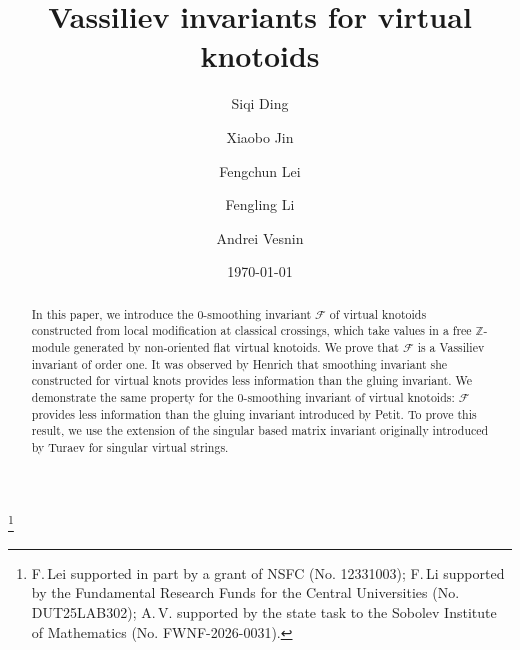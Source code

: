 \documentclass[11pt]{amsart}
\theoremstyle{noparens}
\numberwithin{equation}{section}
\numberwithin{equation}{section}
\begin{document}
\baselineskip 18pt 

\title[Vassiliev invariants for virtual knotoids]{Vassiliev invariants for virtual knotoids}

\author{Siqi Ding}
\address{School of Mathematical Sciences, Dalian University of Technology, Dalian 116024, P. R. China}

\author{Xiaobo Jin}
\address{School of Mathematical Sciences, Dalian University of Technology, Dalian 116024, P. R. China}

\author{Fengchun Lei}
\address{Beijing Institute of Mathematical Sciences and Applications, Beijing 101408, P.R. China; School of Mathematical Sciences, Dalian University of Technology, Dalian 116024, P.R. China. }

\author{Fengling Li}
\address{School of Mathematical Sciences, Dalian University of Technology, Dalian 116024, P. R. China}

\author{Andrei Vesnin}
\address{Sobolev Institute of Mathematics of the Siberian Branch of the Russian Academy of Sciences, Novosibirsk 630090, Russia}

\thanks{F.\,Lei supported in part by a grant of NSFC (No. 12331003); F.\,Li supported by the Fundamental Research Funds for the Central Universities (No. DUT25LAB302); A.\,V. supported by the state task to the Sobolev Institute of Mathematics (No. FWNF-2026-0031).}

\date{\today} 


\begin{abstract}
In this paper, we introduce the 0-smoothing invariant $\mathcal{F}$ of virtual knotoids constructed from local modification at classical crossings, which take values in a free $\mathbb Z$-module generated by non-oriented flat virtual knotoids. We prove that $\mathcal{F}$ is a Vassiliev invariant of order one. It was observed by Henrich that  smoothing invariant she constructed for virtual knots provides less information than the gluing invariant. We demonstrate the same property for the 0-smoothing invariant of virtual knotoids: $\mathcal{F}$ provides less information than the gluing invariant introduced by Petit. To prove this result, we use the extension of the singular based matrix invariant originally introduced by Turaev for singular virtual strings.
\end{abstract}
\end{document}
